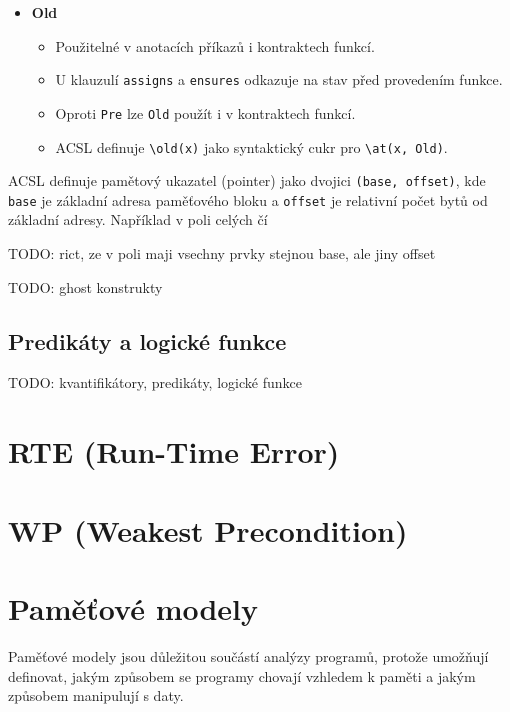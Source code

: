 \begin{itemize}
    \item \textbf{Old}
    \begin{itemize}
        \item Použitelné v anotacích příkazů i kontraktech funkcí.
        \item U klauzulí \texttt{assigns} a \texttt{ensures} odkazuje na stav před provedením funkce.
        \item Oproti \texttt{Pre} lze \texttt{Old} použít i v kontraktech funkcí.
        \item ACSL definuje \texttt{\textbackslash old(x)} jako syntaktický cukr pro \texttt{\textbackslash at(x, Old)}.
    \end{itemize}
\end{itemize}

ACSL definuje pamětový ukazatel (pointer) jako dvojici \texttt{(base, offset)},
kde \texttt{base} je základní adresa paměťového bloku a \texttt{offset} je relativní počet bytů
od základní adresy.
Například v poli celých čí

TODO: rict, ze v poli maji vsechny prvky stejnou base, ale jiny offset


TODO: ghost konstrukty

\subsection{Predikáty a logické funkce}
\label{subsec:acsl-predikaty-a-logicke-funkce}

TODO: kvantifikátory, predikáty, logické funkce



\section{RTE (Run-Time Error)}
\label{sec:frama-c-rte}

\section{WP (Weakest Precondition)}
\label{sec:frama-c-wp}

\section{Paměťové modely}
\label{sec:frama-c-pametove-modely}


Paměťové modely jsou důležitou součástí analýzy programů,
protože umožňují definovat, jakým způsobem se programy chovají
vzhledem k paměti a jakým způsobem manipulují s daty.

